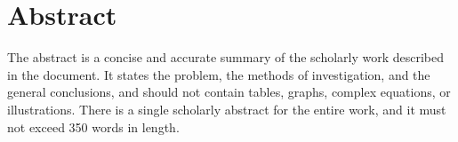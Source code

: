 \section{Abstract}
The abstract is a concise and accurate summary of the scholarly work described in the document. It states the problem, the methods of investigation, and the general conclusions, and should not contain tables, graphs, complex equations, or illustrations. There is a single scholarly abstract for the entire work, and it must not exceed 350 words in length.
